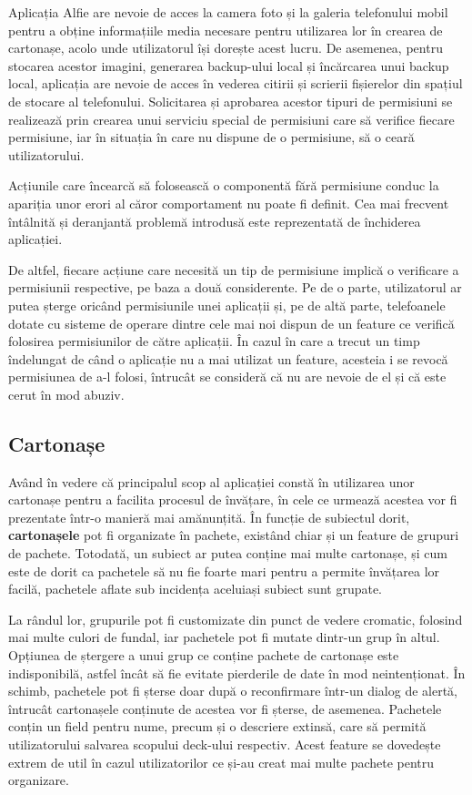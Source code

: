 Aplicația Alfie are nevoie de acces la camera foto și la galeria telefonului mobil pentru a obține informațiile media necesare pentru utilizarea lor în crearea de cartonașe, acolo unde utilizatorul își dorește acest lucru. De asemenea, pentru stocarea acestor imagini, generarea backup-ului local și încărcarea unui backup local, aplicația are nevoie de acces în vederea citirii și scrierii fișierelor din spațiul de stocare al telefonului. Solicitarea și aprobarea acestor tipuri de permisiuni se realizează prin crearea unui serviciu special de permisiuni care să verifice fiecare permisiune, iar în situația în care nu dispune de o permisiune, să o ceară utilizatorului.

Acțiunile care încearcă să folosească o componentă fără permisiune conduc la apariția unor erori al căror comportament nu poate fi definit. Cea mai frecvent întâlnită și deranjantă problemă introdusă este reprezentată de închiderea aplicației.

De altfel, fiecare acțiune care necesită un tip de permisiune implică o verificare a permisiunii respective, pe baza a două considerente. Pe de o parte, utilizatorul ar putea șterge oricând permisiunile unei aplicații și, pe de altă parte, telefoanele dotate cu sisteme de operare dintre cele mai noi dispun de un feature ce verifică folosirea permisiunilor de către aplicații. În cazul în care a trecut un timp îndelungat de când o aplicație nu a mai utilizat un feature, acesteia i se revocă permisiunea de a-l folosi, întrucât se consideră că nu are nevoie de el și că este cerut în mod abuziv.

\subsection{Cartonașe}

Având în vedere că principalul scop al aplicației constă în utilizarea unor cartonașe pentru a facilita procesul de învățare, în cele ce urmează acestea vor fi prezentate într-o manieră mai amănunțită. În funcție de subiectul dorit, \textbf{cartonașele} pot fi organizate în pachete, existând chiar și un feature de grupuri de pachete. Totodată, un subiect ar putea conține mai multe cartonașe, și cum este de dorit ca pachetele să nu fie foarte mari pentru a permite învățarea lor facilă, pachetele aflate sub incidența aceluiași subiect sunt grupate.

La rândul lor, grupurile pot fi customizate din punct de vedere cromatic, folosind mai multe culori de fundal, iar pachetele pot fi mutate dintr-un grup în altul. Opțiunea de ștergere a unui grup ce conține pachete de cartonașe este indisponibilă, astfel încât să fie evitate pierderile de date în mod neintenționat. În schimb, pachetele pot fi șterse doar după o reconfirmare într-un dialog de alertă, întrucât cartonașele conținute de acestea vor fi șterse, de asemenea. Pachetele conțin un field pentru nume, precum și o descriere extinsă, care să permită utilizatorului salvarea scopului deck-ului respectiv. Acest feature se dovedește extrem de util în cazul utilizatorilor ce și-au creat mai multe pachete pentru organizare.

